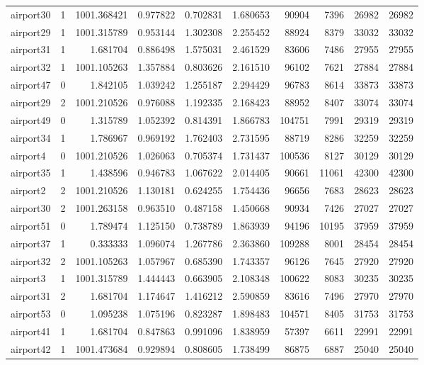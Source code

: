 \begin{longtable}{|l|r|r|r|r|r|r|r|r|r|}
airport30 & 1 & 1001.368421 & 0.977822 & 0.702831 & 1.680653 & 90904 & 7396 & 26982 & 26982 \\
airport29 & 1 & 1001.315789 & 0.953144 & 1.302308 & 2.255452 & 88924 & 8379 & 33032 & 33032 \\
airport31 & 1 & 1.681704 & 0.886498 & 1.575031 & 2.461529 & 83606 & 7486 & 27955 & 27955 \\
airport32 & 1 & 1001.105263 & 1.357884 & 0.803626 & 2.161510 & 96102 & 7621 & 27884 & 27884 \\
airport47 & 0 & 1.842105 & 1.039242 & 1.255187 & 2.294429 & 96783 & 8614 & 33873 & 33873 \\
airport29 & 2 & 1001.210526 & 0.976088 & 1.192335 & 2.168423 & 88952 & 8407 & 33074 & 33074 \\
airport49 & 0 & 1.315789 & 1.052392 & 0.814391 & 1.866783 & 104751 & 7991 & 29319 & 29319 \\
airport34 & 1 & 1.786967 & 0.969192 & 1.762403 & 2.731595 & 88719 & 8286 & 32259 & 32259 \\
airport4 & 0 & 1001.210526 & 1.026063 & 0.705374 & 1.731437 & 100536 & 8127 & 30129 & 30129 \\
airport35 & 1 & 1.438596 & 0.946783 & 1.067622 & 2.014405 & 90661 & 11061 & 42300 & 42300 \\
airport2 & 2 & 1001.210526 & 1.130181 & 0.624255 & 1.754436 & 96656 & 7683 & 28623 & 28623 \\
airport30 & 2 & 1001.263158 & 0.963510 & 0.487158 & 1.450668 & 90934 & 7426 & 27027 & 27027 \\
airport51 & 0 & 1.789474 & 1.125150 & 0.738789 & 1.863939 & 94196 & 10195 & 37959 & 37959 \\
airport37 & 1 & 0.333333 & 1.096074 & 1.267786 & 2.363860 & 109288 & 8001 & 28454 & 28454 \\
airport32 & 2 & 1001.105263 & 1.057967 & 0.685390 & 1.743357 & 96126 & 7645 & 27920 & 27920 \\
airport3 & 1 & 1001.315789 & 1.444443 & 0.663905 & 2.108348 & 100622 & 8083 & 30235 & 30235 \\
airport31 & 2 & 1.681704 & 1.174647 & 1.416212 & 2.590859 & 83616 & 7496 & 27970 & 27970 \\
airport53 & 0 & 1.095238 & 1.075196 & 0.823287 & 1.898483 & 104571 & 8405 & 31753 & 31753 \\
airport41 & 1 & 1.681704 & 0.847863 & 0.991096 & 1.838959 & 57397 & 6611 & 22991 & 22991 \\
airport42 & 1 & 1001.473684 & 0.929894 & 0.808605 & 1.738499 & 86875 & 6887 & 25040 & 25040 \\

\end{longtable}
